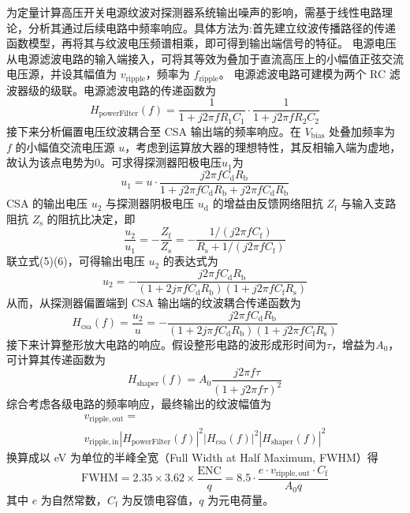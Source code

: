 \documentclass{ctexart}
\begin{document}
为定量计算高压开关电源纹波对探测器系统输出噪声的影响，需基于线性电路理论，分析其通过后续电路中频率响应\cite{13}。具体方法为:首先建立纹波传播路径的传递函数模型，再将其与纹波电压频谱相乘，即可得到输出端信号的特征。
电源电压从电源滤波电路的输入端接入，可将其等效为叠加于直流高压上的小幅值正弦交流电压源，并设其幅值为 $v_{\mathrm{ripple}}$，频率为 $f_{\mathrm{ripple}}$。
电源滤波电路可建模为两个 RC 滤波器级的级联。电源滤波电路的传递函数为
\begin{equation}
H_\text{powerFilter}(f) = \frac{1}{1 + j2\pi f R_1 C_1} \cdot \frac{1}{1 + j2\pi f R_2 C_2}
\end{equation}
接下来分析偏置电压纹波耦合至 CSA 输出端的频率响应。在 $V_{\mathrm{bias}}$ 处叠加频率为 $f$ 的小幅值交流电压源 $u$，考虑到运算放大器的理想特性，其反相输入端为虚地，故认为该点电势为0。可求得探测器阳极电压$u_1$为
\begin{equation}
u_1 = u \cdot \frac{j2\pi f C_{\mathrm{d}} R_{\mathrm{b}}}{1 + j2\pi f C_{\mathrm{d}} R_{\mathrm{b}} + j2\pi f C_{\mathrm{d}} R_{\mathrm{b}}}
\end{equation}
CSA 的输出电压 $u_2$ 与探测器阴极电压 $u_{\mathrm{d}}$ 的增益由反馈网络阻抗 $Z_{\mathrm{f}}$ 与输入支路阻抗 $Z_{\mathrm{s}}$ 的阻抗比决定，即
\begin{equation}
\frac{u_2}{u_1} = -\frac{Z_{\mathrm{f}}}{Z_{\mathrm{s}}} = - \frac{1 / (j2\pi f C_{\mathrm{f}})}{R_{\mathrm{s}} + 1/(j2\pi f C_{\mathrm{f}})}
\end{equation}
联立式(5)(6)，可得输出电压 $u_2$ 的表达式为
\begin{equation}
u_2 = - \frac{j2\pi f C_{\mathrm{d}} R_{\mathrm{b}}}{(1 + 2j\pi f C_{\mathrm{d}} R_{\mathrm{b}})(1 + j2\pi f C_{\mathrm{f}}R_{\mathrm{s}})}
\end{equation}
从而，从探测器偏置端到 CSA 输出端的纹波耦合传递函数为
\begin{equation}
H_\text{csa}(f) = \frac{u_2}{u} = - \frac{j2\pi f C_{\mathrm{d}} R_{\mathrm{b}}}{(1 + 2j\pi f C_{\mathrm{d}} R_{\mathrm{b}})(1 + j2\pi f C_{\mathrm{f}}R_{\mathrm{s}})}
\end{equation}
接下来计算整形放大电路的响应。假设整形电路的波形成形时间为$\tau$，增益为$A_0$，可计算其传递函数为
\begin{equation}
H_\text{shaper}(f) = A_0 \frac{j2\pi f \tau}{(1 + j2\pi f \tau)^2}
\end{equation}
综合考虑各级电路的频率响应，最终输出的纹波幅值为
\begin{multline}
v_{\mathrm{ripple,out}} = \\
 v_{\mathrm{ripple,in}} |H_\text{powerFilter}(f)|^2 |H_\text{csa}(f)|^2 |H_\text{shaper}(f)|^2
\end{multline}
换算成以 eV 为单位的半峰全宽（Full Width at Half Maximum, FWHM）\cite{14}得
\begin{equation}
\mathrm{FWHM} = 2.35\times3.62\times \frac{\mathrm{ENC}}{q} = 8.5 \cdot \frac{e\cdot v_{\mathrm{ripple,out}} \cdot C_{\mathrm{f}}}{A_0q}
\end{equation}
其中 $e$ 为自然常数，$C_{\mathrm{f}}$ 为反馈电容值，$q$ 为元电荷量。
\end{document}
